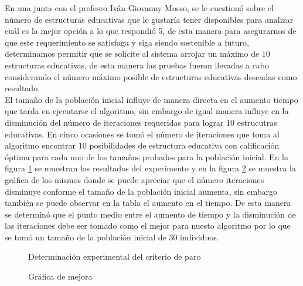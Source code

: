En una junta con el profesro Iván Giovanny Mosso, se le cuestionó sobre el número de estructuras educativas que le gustaría tener disponibles para analizar cuál es la mejor opción a lo que respondió 5, de esta manera para asegurarnos de que este requerimiento se satisfaga y siga siendo sostenible a futuro, determinamos permitir que se solicite al sistema arrojar un máximo de 10 estructuras educativas, de esta manera las pruebas fueron llevadas a cabo considerando el número máximo posible de estructuras educativas deseadas como resultado.\\

El tamaño de la población inicial influye de manera directa en el aumento tiempo que tarda en ejecutarse el algoritmo, sin embargo de igual manera influye en la disminución del número de iteraciones requeridas para lograr 10 estrucutras educativas. En cinco ocasiones se tomó el número de iteraciones que toma al algoritmo encontrar 10 posibilidades de estructura educativa con calificación óptima para cada uno de los tamaños probados para la población inicial. En la figura \ref{fig:PruebaV3} se muestran los resultados del experimento y en la figura \ref{fig:grafV3} se muestra la gráfica de los mismos donde se puede apreciar que el número iteraciones disminuye conforme el tamaño de la población inicial aumenta, sin embargo también se puede observar en la tabla el aumento en el tiempo. De esta manera se determinó que el punto medio entre el aumento de tiempo y la disminución de las iteraciones debe ser tomado como el mejor para nuesto algoritmo por lo que se tomó un tamaño de la población inicial de 30 individuos.\\
 
 \begin{figure}[htbp!]
 	\begin{center}
 		\caption{Determinación experimental del criterio de paro}
 		\label{fig:PruebaV3}
 	\end{center}
 \end{figure}


\begin{figure}[htbp!]
	\begin{center}
		\caption{Gráfica de mejora}
		\label{fig:grafV3}
	\end{center}
\end{figure}

